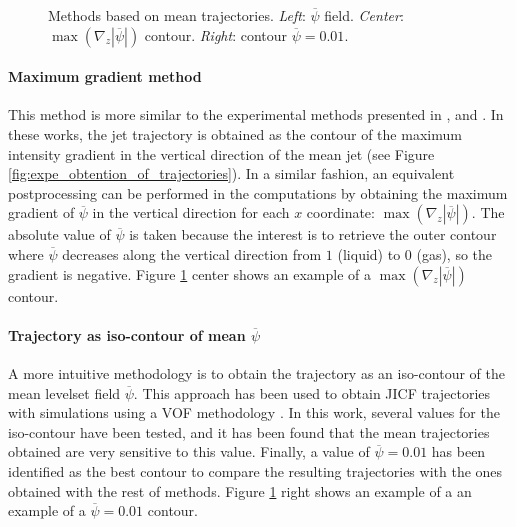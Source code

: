 \begin{figure}[ht]
     \centering
     \caption[Methods based on mean trajectories]{Methods based on mean trajectories. \textsl{Left}: $\overline{\psi}$ field. \textsl{Center}: $\max \left( \nabla_z | \overline{\psi} | \right)$ contour. \textsl{Right}: contour $\overline{\psi} = 0.01$.}
      \label{fig:trajectory_obtention_mean_methods_c_d}
\end{figure}



\paragraph{Maximum gradient method}

This method is more similar to the experimental methods presented in ,  and . In these works, the jet trajectory is obtained as the contour of the maximum intensity gradient in the vertical direction of the mean jet (see Figure \ref{fig:expe_obtention_of_trajectories}). In a similar fashion, an equivalent postprocessing can be performed in the computations by obtaining the maximum gradient of $\overline{\psi}$ in the vertical direction for each $x$ coordinate: $\max \left( \nabla_z | \overline{\psi} | \right)$. The absolute value of $\overline{\psi}$ is taken because the interest is to retrieve the outer contour where $\overline{\psi}$ decreases along the vertical direction from $1$ (liquid) to 0 (gas), so the gradient is negative. Figure \ref{fig:trajectory_obtention_mean_methods_c_d} center shows an example of a $\max \left( \nabla_z | \overline{\psi} | \right)$ contour. \\


\paragraph{Trajectory as iso-contour of mean $\overline{\psi}$}

A more intuitive methodology is to obtain the trajectory as an iso-contour of the mean levelset field $\overline{\psi}$. This approach has been used to obtain JICF trajectories with simulations using a VOF methodology . In this work, several values for the iso-contour have been tested, and it has been found that the mean trajectories obtained are very sensitive to this value. Finally, a value of $\overline{\psi} = 0.01$ has been identified as the best contour to compare the resulting trajectories with the ones obtained with the rest of methods. Figure \ref{fig:trajectory_obtention_mean_methods_c_d} right shows an example of a an example of a $\overline{\psi} = 0.01$ contour. \\

